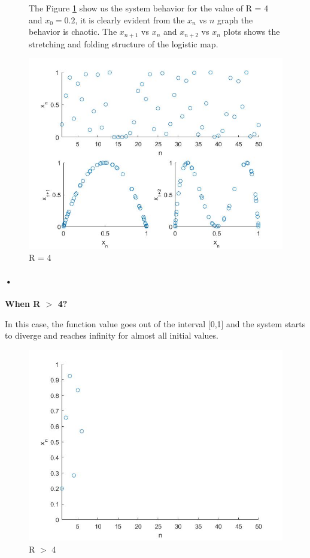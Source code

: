 \documentclass[11pt,a4paper]{article}
\begin{document}
\begin{figure}[H]
The Figure \ref{fig:r4} show us the system behavior for the value of R = 4 and $x_{0} = 0.2$, it is clearly evident from the $x_{n}$ vs $n$ graph the behavior is chaotic. The $x_{n+1}$ vs $x_{n}$ and $x_{n+2}$ vs $x_{n}$ plots shows the stretching and folding structure of the logistic map.  \par\bigskip
\centering
\includegraphics[scale=0.60]{images/r4.jpg}
\caption{R = 4}
\label{fig:r4}
\end{figure}
\paragraph{•}
\textbf{When R $>$ 4?}\\ 
\par\medskip
In this case, the function value goes out of the interval [0,1] and the system starts to diverge and reaches infinity for almost all initial values.
\begin{figure}[H]
\centering
\includegraphics[scale=0.3]{images/rg4.jpg}
\caption{R $>$ 4}
\label{fig:rg4}
\end{figure}
\newpage
\end{document}
